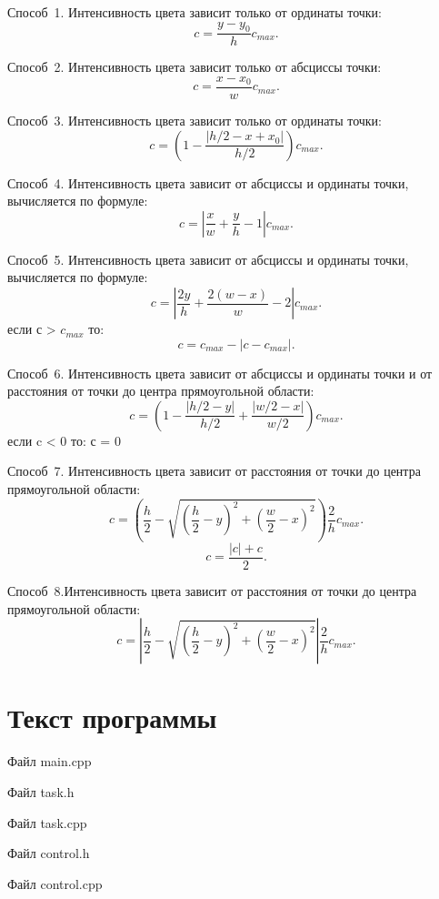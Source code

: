 \documentclass[14pt, a4paper]{extreport}
\begin{document}
Способ~1. Интенсивность цвета зависит только от ординаты точки:
$$ c = \frac{y - y_0}{h} c_{max} . $$

Способ~2. Интенсивность цвета зависит только от абсциссы точки:
$$ c = \frac{x - x_0}{w} c_{max} . $$

Способ~3. Интенсивность цвета зависит только от ординаты точки:
$$ c = (1-\frac{|h/2-x+x_0|}{h/2}) c_{max} . $$

Способ~4. Интенсивность цвета зависит от абсциссы и ординаты точки, вычисляется по формуле:
$$ c = \left|\frac{x}{w}+\frac{y}{h}-1\right| c_{max} . $$

Способ~5. Интенсивность цвета зависит от абсциссы и ординаты точки, вычисляется по формуле:
$$ c = \left|\frac{2y}{h}+\frac{2(w-x)}{w}-2\right| c_{max} . $$
если с > $c_{max}$ то:
$$ c = c_{max}-|c-c_{max}| . $$

Способ~6. Интенсивность цвета зависит от абсциссы и ординаты точки и от расстояния от точки до центра прямоугольной области:
$$ c = \left(1-\frac{|h/2-y|}{h/2}+\frac{|w/2-x|}{w/2}\right) c_{max} . $$
если c < 0 то: с = 0

Способ~7. Интенсивность цвета зависит от расстояния от точки до центра прямоугольной области:
$$ c = \left(\frac{h}{2} - \sqrt{\left(\frac{h}{2}-y\right)^2 + \left(\frac{w}{2}-x\right)^2}\right)\frac{2}{h} c_{max} . $$
$$ c = \frac{|c|+c}{2} . $$

Способ~8.Интенсивность цвета зависит от расстояния от точки до центра прямоугольной области:
$$ c = \left|\frac{h}{2} - \sqrt{\left(\frac{h}{2}-y\right)^2 + \left(\frac{w}{2}-x\right)^2}\right|\frac{2}{h} c_{max} . $$

\chapter{Текст программы}

\noindent Файл main.cpp

\pagebreak
\hrulefill

\noindent Файл task.h

\hrulefill

\noindent Файл task.cpp

\hrulefill

\noindent Файл control.h

\hrulefill

\noindent Файл control.cpp


\end{document}
